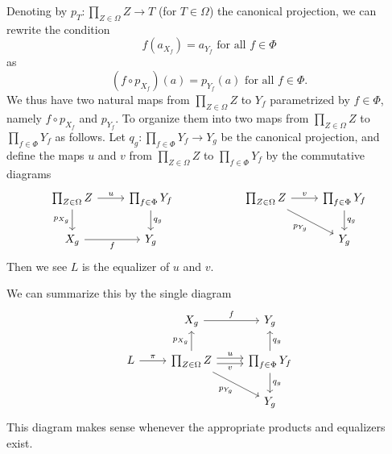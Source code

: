 \documentclass[12pt,letterpaper]{article}%
\begin{document}
Denoting by $p_T:\prod_{Z\in\Omega}Z\to T$ (for $T\in\Omega$) the canonical projection, we can rewrite the condition 
$$
f(a_{X_f})=a_{Y_f}\text{ for all }f\in\Phi
$$ as 
$$
(f\circ p_{X_f})(a)=p_{Y_f}(a)\text{ for all }f\in\Phi.
$$ 
We thus have two natural maps from $\prod_{Z\in\Omega}Z$ to $Y_f$ parametrized by $f\in\Phi$, namely $f\circ p_{X_f}$ and $p_{Y_f}$. To organize them into two maps from $\prod_{Z\in\Omega}Z$ to $\prod_{f\in\Phi}Y_f$ as follows. Let $q_g:\prod_{f\in\Phi}Y_f\to Y_g$ be the canonical projection, and define the maps $u$ and $v$ from $\prod_{Z\in\Omega}Z$ to $\prod_{f\in\Phi}Y_f$ by the commutative diagrams 
\[\begin{tikzcd}
	{\prod_{Z\in\Omega}Z} & {\prod_{f\in\Phi}Y_f} && {\prod_{Z\in\Omega}Z} & {\prod_{f\in\Phi}Y_f} \\
	{X_g} & {Y_g} & {} && {Y_g}
	\arrow["u", from=1-1, to=1-2]
	\arrow["{p_{X_g}}"', from=1-1, to=2-1]
	\arrow["{q_g}", from=1-2, to=2-2]
	\arrow["f"', from=2-1, to=2-2]
	\arrow["v", from=1-4, to=1-5]
	\arrow["{q_g}", from=1-5, to=2-5]
	\arrow["{p_{Y_g}}"', from=1-4, to=2-5]
\end{tikzcd}\]
Then we see $L$ is the equalizer of $u$ and $v$.

We can summarize this by the single diagram 
\[\begin{tikzcd}
	& {X_g} & {Y_g} \\
	L & {\prod_{Z\in\Omega}Z} & {\prod_{f\in\Phi}Y_f} \\
	{} && {Y_g}
	\arrow["v"', shift right=1, from=2-2, to=2-3]
	\arrow["{q_g}", from=2-3, to=3-3]
	\arrow["{p_{Y_g}}"', from=2-2, to=3-3]
	\arrow["u", shift left=1, from=2-2, to=2-3]
	\arrow["f", from=1-2, to=1-3]
	\arrow["{p_{X_g}}", from=2-2, to=1-2]
	\arrow["{q_g}"', from=2-3, to=1-3]
	\arrow["\pi", from=2-1, to=2-2]
\end{tikzcd}\]
This diagram makes sense whenever the appropriate products and equalizers exist.
\end{document}
